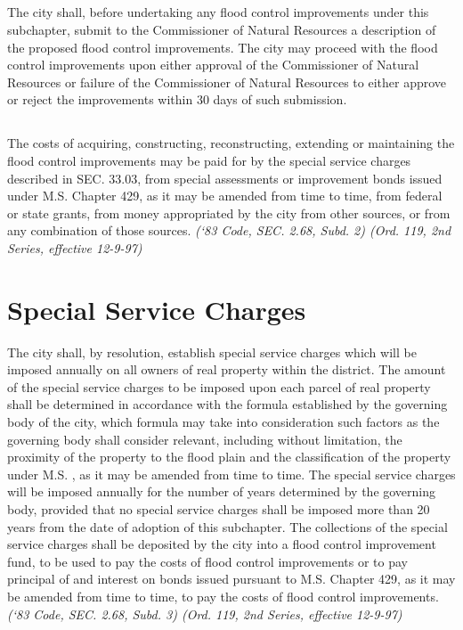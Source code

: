 \documentclass[code.tex]{subfiles}
\begin{document}
\subsection{}
The city shall, before undertaking any flood control improvements under this subchapter, submit to the Commissioner of Natural Resources a description of the proposed flood control improvements.  The city may proceed with the flood control improvements upon either  approval of the Commissioner of Natural Resources or failure of the Commissioner of Natural Resources to either approve or reject the improvements within 30 days of such submission.
\subsection{}
The costs of acquiring, constructing, reconstructing, extending or maintaining the flood control improvements may be paid for by the special service charges described in SEC. 33.03, from special assessments or improvement bonds issued under M.S. Chapter 429, as it may be amended from time to time, from federal or state grants, from money appropriated by the city from other sources, or from any combination of those sources.\newline
\emph{(‘83 Code, SEC. 2.68, Subd. 2)  (Ord. 119, 2nd Series, effective 12-9-97)}
\section{Special Service Charges}
The city shall, by resolution, establish special service charges which will be imposed annually on all owners of real property within the district. The amount of the special service charges to be imposed upon each parcel of real property shall be determined in accordance with the formula established by the governing body of the city, which formula may take into consideration such factors as the governing body shall consider relevant, including without limitation, the proximity of the property to the flood plain and the classification of the property under M.S. , as it may be amended from time to time. The special service charges will be imposed annually for the number of years determined by the governing body, provided that no special service charges shall be imposed more than 20 years from the date of adoption of this subchapter. The collections of the special service charges shall be deposited by the city into a flood control improvement fund, to be used to pay the costs of flood control improvements or to pay principal of and interest on bonds issued pursuant to M.S. Chapter 429, as it may be amended from time to time, to pay the costs of flood control improvements.\newline
\emph{(‘83 Code, SEC. 2.68, Subd. 3)  (Ord. 119, 2nd Series, effective 12-9-97)}\newline
\end{document}
